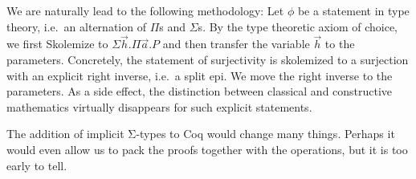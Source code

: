 \documentclass[a4paper,10pt,runningheads]{llncs}
\begin{document}
We are naturally lead to the following methodology: Let $\phi$ be a statement in type
theory, i.e.\ an alternation of $\Pi$s and $\Sigma$s. By the type theoretic axiom of choice, we first Skolemize to $\Sigma \overrightarrow{h}. \Pi \overrightarrow{a}. P$ and then transfer the variable $\overrightarrow{h}$ to the parameters. Concretely, the statement of surjectivity is skolemized to a surjection with an explicit right inverse, i.e.\ a split epi. We move the right inverse to the parameters. As a side effect, the distinction between classical and constructive mathematics virtually disappears for such explicit statements.

The addition of implicit Σ-types to Coq would change many things. Perhaps it would even allow us
to pack the proofs together with the operations, but it is too early to tell.

% 
% 
% 
% 
% 
\end{document}
